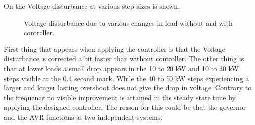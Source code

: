On  the Voltage disturbance at various step sizes is shown.




\begin{figure}[H]
\centering

\caption{Voltage disturbance due to various changes in load without and with controller.}
\label{fig:test8+11volt-1020-4050-1030-1050}
\end{figure}

First thing that appears when applying the controller is that the Voltage disturbance is corrected a bit faster than without controller. The other thing is that at lower loads a small drop appears in the 10 to 20 kW and 10 to 30 kW steps visible at the 0.4 second mark. While the 40 to 50 kW steps experiencing a larger and longer lasting overshoot does not give the drop in voltage. Contrary to the frequency no visible improvement is attained in the steady state time by applying the designed controller.
The reason for this could be that the governor and the AVR functions as two independent systems.  




